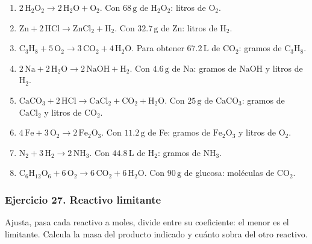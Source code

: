 \begin{enumerate}
    \item[a)] $2\,\mathrm{H_2O_2}\rightarrow2\,\mathrm{H_2O}+\mathrm{O_2}$.
    Con $68\,\mathrm{g}$ de $\mathrm{H_2O_2}$:
    litros de $\mathrm{O_2}$.

    \item[b)] $\mathrm{Zn}+2\,\mathrm{HCl}\rightarrow
    \mathrm{ZnCl_2}+\mathrm{H_2}$.
    Con $32.7\,\mathrm{g}$ de Zn:
    litros de $\mathrm{H_2}$.

    \item[c)] $\mathrm{C_3H_8}+5\,\mathrm{O_2}\rightarrow
    3\,\mathrm{CO_2}+4\,\mathrm{H_2O}$.
    Para obtener $67.2\,\mathrm{L}$ de $\mathrm{CO_2}$:
    gramos de $\mathrm{C_3H_8}$.

    \item[d)] $2\,\mathrm{Na}+2\,\mathrm{H_2O}\rightarrow
    2\,\mathrm{NaOH}+\mathrm{H_2}$.
    Con $4.6\,\mathrm{g}$ de Na:
    gramos de $\mathrm{NaOH}$ y litros de $\mathrm{H_2}$.

    \item[e)] $\mathrm{CaCO_3}+2\,\mathrm{HCl}\rightarrow
    \mathrm{CaCl_2}+\mathrm{CO_2}+\mathrm{H_2O}$.
    Con $25\,\mathrm{g}$ de $\mathrm{CaCO_3}$:
    gramos de $\mathrm{CaCl_2}$ y litros de $\mathrm{CO_2}$.

    \item[f)] $4\,\mathrm{Fe}+3\,\mathrm{O_2}\rightarrow2\,\mathrm{Fe_2O_3}$.
    Con $11.2\,\mathrm{g}$ de Fe:
    gramos de $\mathrm{Fe_2O_3}$ y litros de $\mathrm{O_2}$.

    \item[g)] $\mathrm{N_2}+3\,\mathrm{H_2}\rightarrow2\,\mathrm{NH_3}$.
    Con $44.8\,\mathrm{L}$ de $\mathrm{H_2}$:
    gramos de $\mathrm{NH_3}$.

    \item[h)] $\mathrm{C_6H_{12}O_6}+6\,\mathrm{O_2}\rightarrow
    6\,\mathrm{CO_2}+6\,\mathrm{H_2O}$.
    Con $90\,\mathrm{g}$ de glucosa:
    moléculas de $\mathrm{CO_2}$.
\end{enumerate}

\subsubsection*{Ejercicio 27. Reactivo limitante}

Ajusta, pasa cada reactivo a moles, divide entre su coeficiente:
el menor es el limitante.
Calcula la masa del producto indicado y cuánto sobra del otro reactivo.

